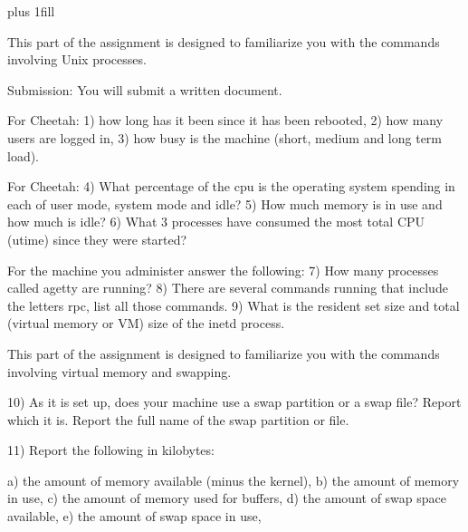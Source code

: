 
\rightskip=0pt plus 1fill

\parindent 0pt

This part of the assignment is designed to familiarize you with the
commands involving Unix processes.

Submission: You will submit a written document.

For Cheetah: 1) how long has it been since it has
been rebooted, 2) how many users are logged in, 3) how busy is the machine
(short, medium and long term load).

For Cheetah: 4) What percentage of the cpu is the operating system
spending in each of user mode, system mode and idle?
5) How much memory is in use and
how much is idle?
6) What 3 processes have consumed the most total CPU ({\ltt{}utime}) since
they were started?

For the machine you administer answer the following:
7) How many processes called {\ltt{}agetty} are running?
8) There are several commands running that include the letters {\ltt{}rpc},
list all those commands.
9) What is the resident set size and total (virtual memory or VM) size of the
{\ltt{}inetd} process.

%
%

This part of the assignment is designed to familiarize you with the
commands involving virtual memory and swapping.

10) As it is set up,
does your machine use a swap partition or a swap file? 
Report which it is.
Report the full name of the swap partition or file.

11) Report the following in kilobytes:

a) the amount of memory available (minus the kernel),
\break
b) the amount of memory in use,
\break
c) the amount of memory used for buffers,
\break
d) the amount of swap space available,
\break
e) the amount of swap space in use,

